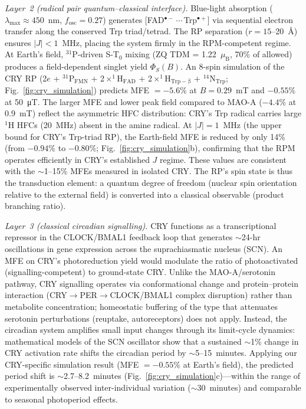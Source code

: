 \documentclass[11pt]{article}
\begin{document}
\emph{Layer~2 (radical pair quantum--classical interface).} Blue-light absorption ($\lambda_\mathrm{max} \approx 450$~nm, $f_\mathrm{osc} = 0.27$) generates [FAD$^{\bullet-}$\,$\cdots$\,Trp$^{\bullet+}$] via sequential electron transfer along the conserved Trp triad/tetrad\cite{Xu2021}. The RP separation ($r = 15$--20~\AA) ensures $|J| < 1$~MHz\cite{Hiscock2016}, placing the system firmly in the RPM-competent regime. At Earth's field, $^{31}$P-driven S-T$_0$ mixing (ZQ TDM = 1.22~$\mu_\mathrm{B}$, 70\% of allowed) produces a field-dependent singlet yield $\Phi_S(B)$. An 8-spin simulation of the CRY RP (2$e$ + $^{31}$P$_\mathrm{FMN}$ + 2$\times^1$H$_\mathrm{FAD}$ + 2$\times^1$H$_\mathrm{Trp-\beta}$ + $^{14}$N$_\mathrm{Trp}$; Fig.~\ref{fig:cry_simulation}) predicts MFE $= -5.6\%$ at $B = 0.29$~mT and $-0.55\%$ at 50~\si{\micro\tesla}. The larger MFE and lower peak field compared to MAO-A ($-4.4\%$ at 0.9~mT) reflect the asymmetric HFC distribution: CRY's Trp radical carries large $^1$H HFCs (20~MHz) absent in the amine radical. At $|J| = 1$~MHz (the upper bound for CRY's Trp-triad RP\cite{Hiscock2016}), the Earth-field MFE is reduced by only 14\% (from $-0.94\%$ to $-0.80\%$; Fig.~\ref{fig:cry_simulation}b), confirming that the RPM operates efficiently in CRY's established $J$ regime. These values are consistent with the $\sim$1--15\% MFEs measured in isolated CRY\cite{Maeda2012}. The RP's spin state is thus the transduction element: a quantum degree of freedom (nuclear spin orientation relative to the external field) is converted into a classical observable (product branching ratio).

\emph{Layer~3 (classical circadian signalling).} CRY functions as a transcriptional repressor in the CLOCK/BMAL1 feedback loop that generates $\sim$24-hr oscillations in gene expression across the suprachiasmatic nucleus (SCN)\cite{Partch2014}. An MFE on CRY's photoreduction yield would modulate the ratio of photoactivated (signalling-competent) to ground-state CRY. Unlike the MAO-A/serotonin pathway, CRY signalling operates via conformational change and protein--protein interaction (CRY$\to$PER$\to$CLOCK/BMAL1 complex disruption) rather than metabolite concentration; homeostatic buffering of the type that attenuates serotonin perturbations (reuptake, autoreceptors) does not apply. Instead, the circadian system amplifies small input changes through its limit-cycle dynamics: mathematical models of the SCN oscillator show that a sustained $\sim$1\% change in CRY activation rate shifts the circadian period by $\sim$5--15~minutes\cite{Forger2011}. Applying our CRY-specific simulation result (MFE $= -0.55\%$ at Earth's field), the predicted period shift is $\sim$2.7--8.2~minutes (Fig.~\ref{fig:cry_simulation}c)---within the range of experimentally observed inter-individual variation ($\sim$30~minutes) and comparable to seasonal photoperiod effects.
\end{document}
